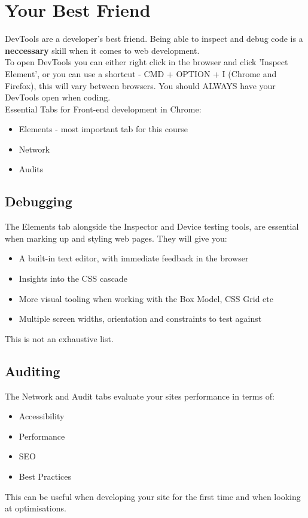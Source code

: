 \section{Your Best Friend}

DevTools are a developer’s best friend. Being able to inspect and debug code is a \textbf{neccessary} skill when it comes to web development.
\\


To open DevTools you can either right click in the browser and click 'Inspect Element', or you can use a shortcut - CMD + OPTION + I (Chrome and Firefox), this will vary between browsers. You should ALWAYS have your DevTools open when coding.
\\

Essential Tabs for Front-end development in Chrome:
\\

\begin{itemize}
    \item Elements - most important tab for this course
    \item Network
    \item Audits
\end{itemize}

\subsection{Debugging}

The Elements tab alongside the Inspector and Device testing tools, are essential when marking up and styling web pages. They will give you:
\\

\begin{itemize}
    \item A built-in text editor, with immediate feedback in the browser
    \item Insights into the CSS cascade
    \item More visual tooling when working with the Box Model, CSS Grid etc
    \item Multiple screen widths, orientation and constraints to test against
\end{itemize}

This is not an exhaustive list.
\\

\subsection{Auditing}

The Network and Audit tabs evaluate your sites performance in terms of: 
\\

\begin{itemize}
    \item Accessibility
    \item Performance
    \item SEO
    \item Best Practices
\end{itemize}

This can be useful when developing your site for the first time and when looking at optimisations.
\\